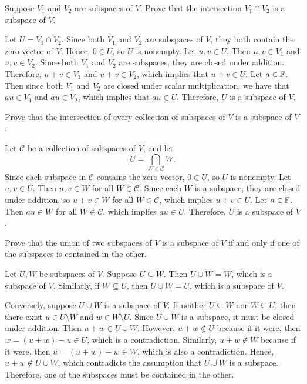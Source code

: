 \begin{exc}
\begin{exercise}
Suppose $V_1$ and $V_2$ are subspaces of $V$. Prove that the intersection
$V_1\cap V_2$ is a subspace of $V$.
\end{exercise}
\begin{solution}
Let $U=V_1\cap V_2$. Since both $V_1$ and $V_2$ are subspaces of $V$, they both
contain the zero vector of $V$. Hence, $0\in U$, so $U$ is nonempty. Let
$u,v\in U$. Then $u,v\in V_1$ and $u,v\in V_2$. Since both $V_1$ and $V_2$ are
subspaces, they are closed under addition. Therefore, $u+v\in V_1$ and
$u+v\in V_2$, which implies that $u+v\in U$. Let $a\in\mathbb{F}$. Then since both
$V_1$ and $V_2$ are closed under scalar multiplication, we have that
$au\in V_1$ and $au\in V_2$, which implies that $au\in U$. Therefore, $U$ is a
subspace of $V$.
\end{solution}

\begin{exercise}
Prove that the intersection of every collection of subspaces of $V$ is a
subspace of $V$.
\end{exercise}
\begin{solution}
Let $\mathcal{C}$ be a collection of subspaces of $V$, and let
\[ U = \bigcap_{W\in\mathcal{C}} W. \]
Since each subspace in $\mathcal{C}$ contains the zero vector, $0\in U$, so $U$
is nonempty. Let $u,v\in U$. Then $u,v\in W$ for all $W\in\mathcal{C}$. Since
each $W$ is a subspace, they are closed under addition, so $u+v\in W$ for all
$W\in\mathcal{C}$, which implies $u+v\in U$. Let $a\in\mathbb{F}$. Then $au\in W$ for
all $W\in\mathcal{C}$, which implies $au\in U$. Therefore, $U$ is a subspace of
$V$.
\end{solution}

\begin{exercise}
Prove that the union of two subspaces of $V$ is a subspace of $V$ if and only
if one of the subspaces is contained in the other.
\end{exercise}
\begin{solution}
Let $U,W$ be subspaces of $V$. Suppose $U\subseteq W$. Then $U\cup W=W$, which
is a subspace of $V$. Similarly, if $W\subseteq U$, then $U\cup W=U$, which is
a subspace of $V$.

Conversely, suppose $U\cup W$ is a subspace of $V$. If neither $U\subseteq W$
nor $W\subseteq U$, then there exist $u\in U\setminus W$ and
$w\in W\setminus U$. Since $U\cup W$ is a subspace, it must be closed under
addition. Then $u+w\in U\cup W$. However, $u+w\notin U$ because if it were,
then $w=(u+w)-u\in U$, which is a contradiction. Similarly, $u+w\notin W$
because if it were, then $u=(u+w)-w\in W$, which is also a contradiction.
Hence, $u+w\notin U\cup W$, which contradicts the assumption that $U\cup W$ is
a subspace. Therefore, one of the subspaces must be contained in the other.
\end{solution}


\end{exc}
